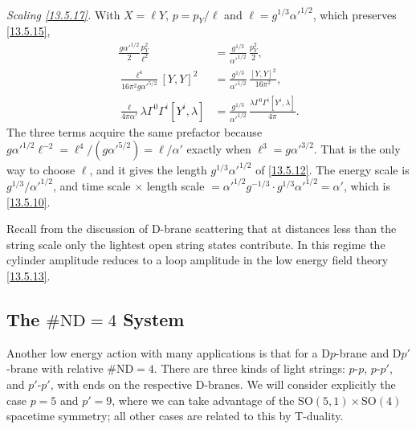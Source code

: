 \begin{tcolorbox}[breakable]
\begin{remark}
		\textit{Scaling \eqref{13.5.17}.} With $X=\ell Y$, $p=p_Y/\ell$ and $\ell=g^{1/3}\alpha'^{1/2}$, which preserves \eqref{13.5.15},
		\begin{align*}
			\frac{g\alpha'^{1/2}}{2}\frac{p_Y^2}{\ell^2} &= \frac{g^{1/3}}{\alpha'^{1/2}}\,\frac{p_Y^2}{2},\\
			\frac{\ell^4}{16\pi^2g\alpha'^{5/2}}[Y,Y]^2 &= \frac{g^{1/3}}{\alpha'^{1/2}}\,\frac{[Y,Y]^2}{16\pi^2},\\
			\frac{\ell}{4\pi\alpha'}\lambda\Gamma^0\Gamma^i[Y^i,\lambda] &= \frac{g^{1/3}}{\alpha'^{1/2}}\,\frac{\lambda\Gamma^0\Gamma^i[Y^i,\lambda]}{4\pi} .
		\end{align*}
		The three terms acquire the same prefactor because $g\alpha'^{1/2}\ell^{-2}=\ell^4/(g\alpha'^{5/2})=\ell/\alpha'$ exactly when $\ell^3=g\alpha'^{3/2}$. That is the only way to choose $\ell$, and it gives the length $g^{1/3}\alpha'^{1/2}$ of \eqref{13.5.12}. The energy scale is $g^{1/3}/\alpha'^{1/2}$, and time scale $\times$ length scale $=\alpha'^{1/2}g^{-1/3}\cdot g^{1/3}\alpha'^{1/2}=\alpha'$, which is \eqref{13.5.10}.
	\end{remark}
\end{tcolorbox}

Recall from the discussion of D-brane scattering that at distances less than the string scale only the lightest open string states contribute. In this regime the cylinder amplitude reduces to a loop amplitude in the low energy field theory \eqref{13.5.13}.

\subsection*{The $\#\mathrm{ND} = 4$ System}

Another low energy action with many applications is that for a D$p$-brane and D$p'$-brane with relative $\#\mathrm{ND} = 4$. There are three kinds of light strings: $p$-$p$, $p$-$p'$, and $p'$-$p'$, with ends on the respective D-branes. We will consider explicitly the case $p = 5$ and $p' = 9$, where we can take advantage of the $\mathrm{SO}(5,1)\times\mathrm{SO}(4)$ spacetime symmetry; all other cases are related to this by T-duality.

